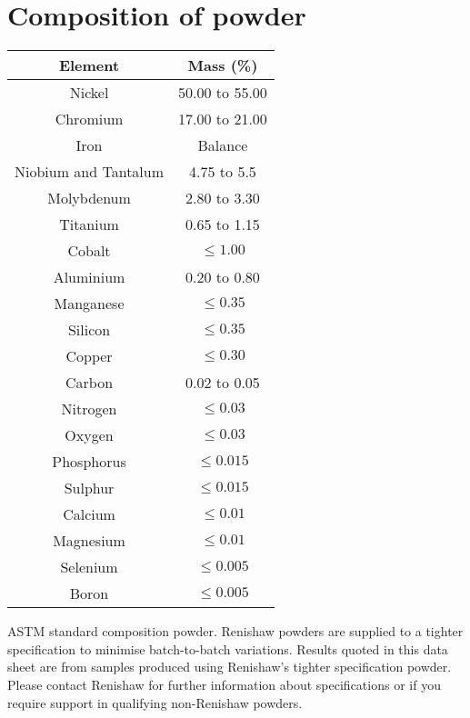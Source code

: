 \documentclass[10pt]{article}
\begin{document}
\section*{Composition of powder}
\begin{center}
\begin{tabular}{|c|c|}
\hline
Element & Mass (\%) \\
\hline
Nickel & 50.00 to 55.00 \\
\hline
Chromium & 17.00 to 21.00 \\
\hline
Iron & Balance \\
\hline
Niobium and Tantalum & 4.75 to 5.5 \\
\hline
Molybdenum & 2.80 to 3.30 \\
\hline
Titanium & 0.65 to 1.15 \\
\hline
Cobalt & $\leq 1.00$ \\
\hline
Aluminium & 0.20 to 0.80 \\
\hline
Manganese & $\leq 0.35$ \\
\hline
Silicon & $\leq 0.35$ \\
\hline
Copper & $\leq 0.30$ \\
\hline
Carbon & 0.02 to 0.05 \\
\hline
Nitrogen & $\leq 0.03$ \\
\hline
Oxygen & $\leq 0.03$ \\
\hline
Phosphorus & $\leq 0.015$ \\
\hline
Sulphur & $\leq 0.015$ \\
\hline
Calcium & $\leq 0.01$ \\
\hline
Magnesium & $\leq 0.01$ \\
\hline
Selenium & $\leq 0.005$ \\
\hline
Boron & $\leq 0.005$ \\
\hline
\end{tabular}
\end{center}

ASTM standard composition powder. Renishaw powders are supplied to a tighter specification to minimise batch-to-batch variations. Results quoted in this data sheet are from samples produced using Renishaw's tighter specification powder. Please contact Renishaw for further information about specifications or if you require support in qualifying non-Renishaw powders.
\end{document}
